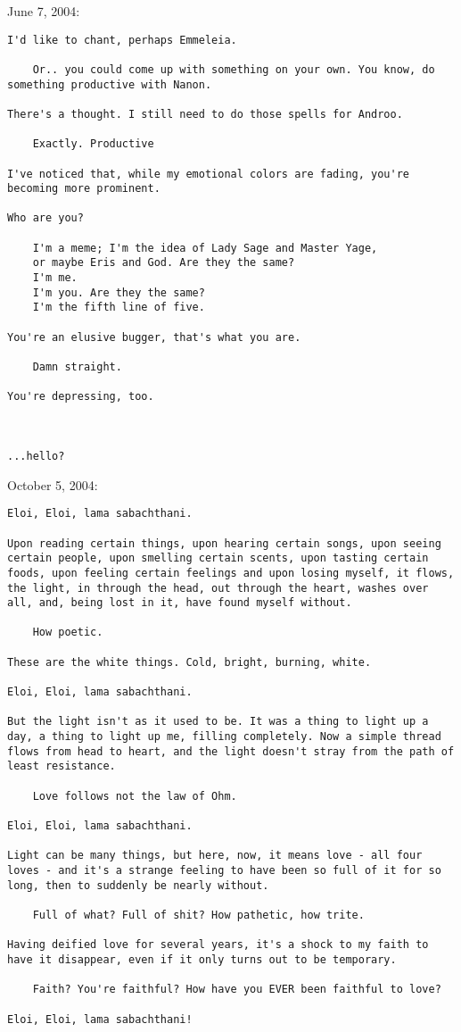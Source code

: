 June 7, 2004:

\begin{verbatim}
I'd like to chant, perhaps Emmeleia.

    Or.. you could come up with something on your own. You know, do something productive with Nanon.

There's a thought. I still need to do those spells for Androo.

    Exactly. Productive

I've noticed that, while my emotional colors are fading, you're becoming more prominent.

Who are you?

    I'm a meme; I'm the idea of Lady Sage and Master Yage,
    or maybe Eris and God. Are they the same?
    I'm me.
    I'm you. Are they the same?
    I'm the fifth line of five.

You're an elusive bugger, that's what you are.

    Damn straight.

You're depressing, too.



...hello?
\end{verbatim}

October 5, 2004:

\begin{verbatim}
Eloi, Eloi, lama sabachthani.

Upon reading certain things, upon hearing certain songs, upon seeing certain people, upon smelling certain scents, upon tasting certain foods, upon feeling certain feelings and upon losing myself, it flows, the light, in through the head, out through the heart, washes over all, and, being lost in it, have found myself without.

    How poetic.

These are the white things. Cold, bright, burning, white.

Eloi, Eloi, lama sabachthani.

But the light isn't as it used to be. It was a thing to light up a day, a thing to light up me, filling completely. Now a simple thread flows from head to heart, and the light doesn't stray from the path of least resistance.

    Love follows not the law of Ohm.

Eloi, Eloi, lama sabachthani.

Light can be many things, but here, now, it means love - all four loves - and it's a strange feeling to have been so full of it for so long, then to suddenly be nearly without.

    Full of what? Full of shit? How pathetic, how trite.

Having deified love for several years, it's a shock to my faith to have it disappear, even if it only turns out to be temporary.

    Faith? You're faithful? How have you EVER been faithful to love?

Eloi, Eloi, lama sabachthani!
\end{verbatim}
